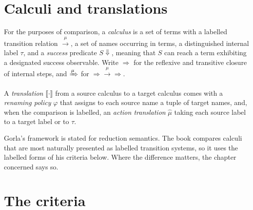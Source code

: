 \documentclass[11pt,openany]{book}
\theoremstyle{remark}
\begin{document}
\section{Calculi and translations}

For the purposes of comparison, a \emph{calculus} is a set of terms with a
labelled transition relation $\xrightarrow{\mu}$, a set of names occurring
in terms, a distinguished internal label $\tau$, and a \emph{success}
predicate $S\Downarrow$, meaning that $S$ can reach a term exhibiting a
designated success observable. Write $\Rightarrow$ for the reflexive and
transitive closure of internal steps, and $\xRightarrow{\mu}$ for
$\Rightarrow\xrightarrow{\mu}\Rightarrow$.

A \emph{translation} $\llbracket\cdot\rrbracket$ from a source calculus to a
target calculus comes with a \emph{renaming policy} $\varphi$ that assigns
to each source name a tuple of target names, and, when the comparison is
labelled, an \emph{action translation} $\widehat\mu$ taking each source
label to a target label or to $\tau$.

Gorla's framework is stated for reduction semantics. The book compares
calculi that are most naturally presented as labelled transition systems,
so it uses the labelled forms of his criteria below. Where the difference
matters, the chapter concerned says so.

\section{The criteria}
\end{document}
